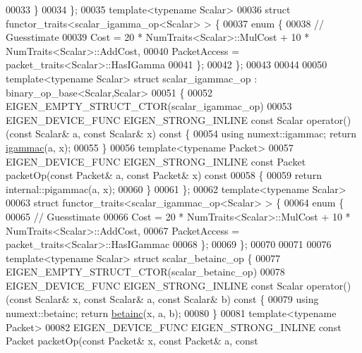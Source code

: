 \begin{DoxyCode}
00033   \}
00034 \};
00035 \textcolor{keyword}{template}<\textcolor{keyword}{typename} Scalar>
00036 \textcolor{keyword}{struct }functor\_traits<scalar\_igamma\_op<Scalar> > \{
00037   \textcolor{keyword}{enum} \{
00038     \textcolor{comment}{// Guesstimate}
00039     Cost = 20 * NumTraits<Scalar>::MulCost + 10 * NumTraits<Scalar>::AddCost,
00040     PacketAccess = packet\_traits<Scalar>::HasIGamma
00041   \};
00042 \};
00043 
00044 
00050 \textcolor{keyword}{template}<\textcolor{keyword}{typename} Scalar> \textcolor{keyword}{struct }scalar\_igammac\_op : binary\_op\_base<Scalar,Scalar>
00051 \{
00052   EIGEN\_EMPTY\_STRUCT\_CTOR(scalar\_igammac\_op)
00053   EIGEN\_DEVICE\_FUNC EIGEN\_STRONG\_INLINE \textcolor{keyword}{const} Scalar operator() (\textcolor{keyword}{const} Scalar& a, \textcolor{keyword}{const} Scalar& x)\textcolor{keyword}{ const }\{
00054     \textcolor{keyword}{using} numext::igammac; \textcolor{keywordflow}{return} \hyperlink{namespace_eigen_a1abaa2ff8c7b1871eaf026a47c6bbf3b}{igammac}(a, x);
00055   \}
00056   \textcolor{keyword}{template}<\textcolor{keyword}{typename} Packet>
00057   EIGEN\_DEVICE\_FUNC EIGEN\_STRONG\_INLINE \textcolor{keyword}{const} Packet packetOp(\textcolor{keyword}{const} Packet& a, \textcolor{keyword}{const} Packet& x)\textcolor{keyword}{ const}
00058 \textcolor{keyword}{  }\{
00059     \textcolor{keywordflow}{return} internal::pigammac(a, x);
00060   \}
00061 \};
00062 \textcolor{keyword}{template}<\textcolor{keyword}{typename} Scalar>
00063 \textcolor{keyword}{struct }functor\_traits<scalar\_igammac\_op<Scalar> > \{
00064   \textcolor{keyword}{enum} \{
00065     \textcolor{comment}{// Guesstimate}
00066     Cost = 20 * NumTraits<Scalar>::MulCost + 10 * NumTraits<Scalar>::AddCost,
00067     PacketAccess = packet\_traits<Scalar>::HasIGammac
00068   \};
00069 \};
00070 
00071 
00076 \textcolor{keyword}{template}<\textcolor{keyword}{typename} Scalar> \textcolor{keyword}{struct }scalar\_betainc\_op \{
00077   EIGEN\_EMPTY\_STRUCT\_CTOR(scalar\_betainc\_op)
00078   EIGEN\_DEVICE\_FUNC EIGEN\_STRONG\_INLINE \textcolor{keyword}{const} Scalar operator() (\textcolor{keyword}{const} Scalar& x, \textcolor{keyword}{const} Scalar& a, \textcolor{keyword}{const} 
      Scalar& b)\textcolor{keyword}{ const }\{
00079     \textcolor{keyword}{using} numext::betainc; \textcolor{keywordflow}{return} \hyperlink{namespace_eigen_a726eae91d4e91d8e25cbe55fffa6a92f}{betainc}(x, a, b);
00080   \}
00081   \textcolor{keyword}{template}<\textcolor{keyword}{typename} Packet>
00082   EIGEN\_DEVICE\_FUNC EIGEN\_STRONG\_INLINE \textcolor{keyword}{const} Packet packetOp(\textcolor{keyword}{const} Packet& x, \textcolor{keyword}{const} Packet& a, \textcolor{keyword}{const} 

\end{DoxyCode}

